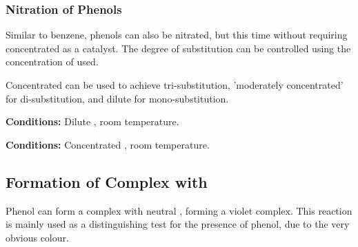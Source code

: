 
			\pagebreak

			\subsubsection{Nitration of Phenols}

				Similar to benzene, phenols can also be nitrated, but this time without requiring concentrated  as a catalyst.
				The degree of substitution can be controlled using the concentration of  used.

				Concentrated  can be used to achieve tri-substitution, 'moderately concentrated' for di-substitution, and
				dilute  for mono-substitution.

				\vspace{1.5em}
				\vbox{\textbf{Conditions:}	\tabto{35mm}Dilute , room temperature.}


				\vspace{1.5em}
				\vbox{\textbf{Conditions:}	\tabto{35mm}Concentrated , room temperature.}





		\pagebreak
		\subsection{Formation of Complex with }

			Phenol can form a complex with neutral , forming a violet complex. This reaction is mainly
			used as a distinguishing test for the presence of phenol, due to the very obvious colour.

